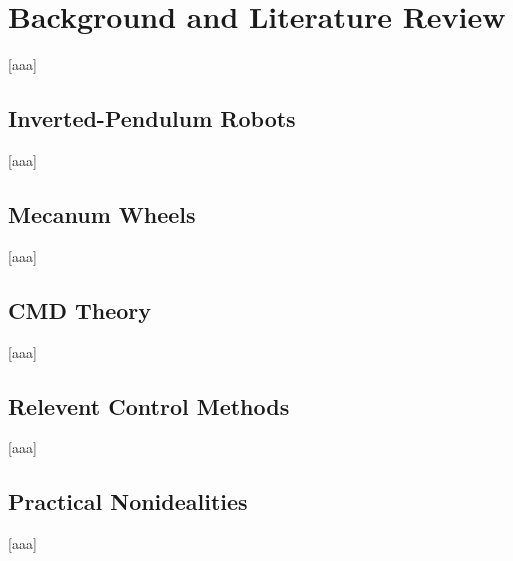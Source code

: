 \chapter{Background and Literature Review} \label{sec:Background and Literature Review}
    [aaa]

\section{Inverted-Pendulum Robots} \label{sec:Inverted-Pendulum Robots}
    [aaa]

\section{Mecanum Wheels} \label{sec:Mecanum Wheels}
    [aaa]

\section{CMD Theory} \label{sec:CMD Theory}
    [aaa]

\section{Relevent Control Methods} \label{sec:Relevent Control Methods}
    [aaa]

\section{Practical Nonidealities} \label{sec:Practical Nonidealities}
    [aaa]
